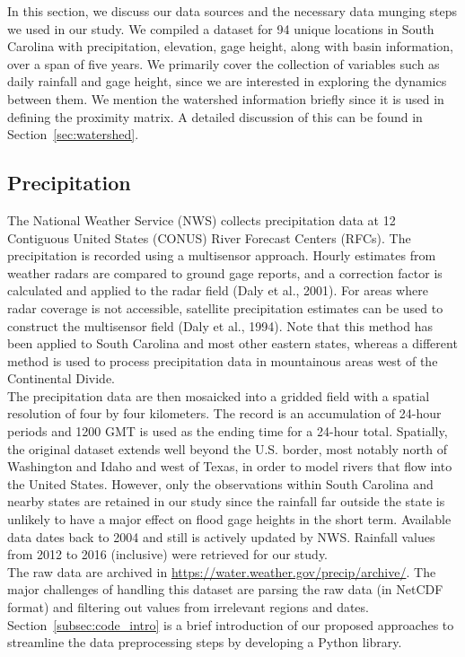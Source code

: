 
In this section, we discuss our data sources and the necessary data munging steps we used in our study.
We compiled a dataset for 94 unique locations in South Carolina with precipitation, elevation, gage height, along with basin information, over a span of five years.
We primarily cover the collection of variables such as daily rainfall and gage height, since we are interested in exploring the dynamics between them.
We mention the watershed information briefly since it is used in defining the proximity matrix.
A detailed discussion of this can be found in Section~\ref{sec:watershed}.

\subsection{Precipitation}\label{subsec:precipitation}
The National Weather Service (NWS) collects precipitation data at 12 Contiguous United States (CONUS) River Forecast Centers (RFCs).
The precipitation is recorded using a multisensor approach.
Hourly estimates from weather radars are compared to ground gage reports, and a correction factor is calculated and applied to the radar field (Daly et al., 2001).
For areas where radar coverage is not accessible, satellite precipitation estimates can be used to construct the multisensor field (Daly et al., 1994).
Note that this method has been applied to South Carolina and most other eastern states, whereas a different method is used to process  precipitation data in mountainous areas west of the Continental Divide.\\

The precipitation data are then mosaicked into a gridded field with a spatial resolution of four by four kilometers.
The record is an accumulation of 24-hour periods and 1200 GMT is used as the ending time for a 24-hour total.
Spatially, the original dataset extends well beyond the U.S. border, most notably north of Washington and Idaho and west of Texas, in order to model rivers that flow into the United States.
However, only the observations within South Carolina and nearby states are retained in our study since the rainfall far outside the state is unlikely to have a major effect on flood gage heights in the short term.
Available data dates back to 2004 and still is actively updated by NWS. Rainfall values from 2012 to 2016 (inclusive) were retrieved for our study.  \\

The raw data are archived in \url{https://water.weather.gov/precip/archive/}.
The major challenges of handling this dataset are parsing the raw data (in NetCDF format) and filtering out values from  irrelevant regions and dates.
 Section~\ref{subsec:code_intro} is a brief introduction of our proposed approaches to streamline the data preprocessing steps by developing a Python library.


